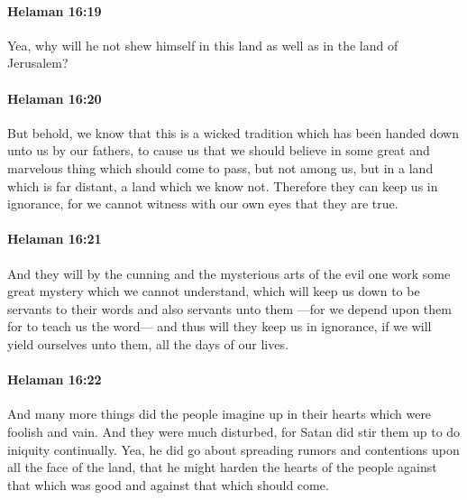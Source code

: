 		\paragraph{Helaman 16:19} %
			\label{HELAMAN-16-19}

			Yea, why will he not shew himself in this land
			as well as in the land of Jerusalem?

		\paragraph{Helaman 16:20} %
			\label{HELAMAN-16-20}

			But behold, we know that this is a wicked tradition
			which has been handed down unto us by our fathers,
			to cause us that we should believe
			in some great and marvelous thing which should come to pass,
			but not among us, but in a land which is far distant,
			a land which we know not.
			Therefore they can keep us in ignorance,
			for we cannot witness with our own eyes that they are true.

		\paragraph{Helaman 16:21} %
			\label{HELAMAN-16-21}

			And they will by the cunning and the mysterious arts of the evil one
			work some great mystery which we cannot understand,
			which will keep us down to be servants to their words and also servants unto them
			---for we depend upon them for to teach us the word---
			and thus will they keep us in ignorance,
			if we will yield ourselves unto them,
			all the days of our lives.

		\paragraph{Helaman 16:22} %
			\label{HELAMAN-16-22}

			And many more things did the people imagine up in their hearts
			which were foolish and vain.
			And they were much disturbed,
			for Satan did stir them up to do iniquity continually.
			Yea, he did go about spreading rumors and contentions
			upon all the face of the land,
			that he might harden the hearts of the people
			against that which was good
			and against that which should come.

